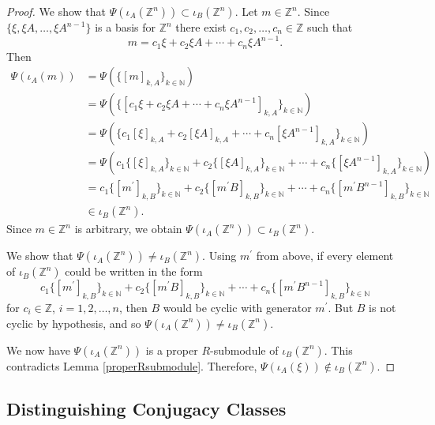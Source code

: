 \documentclass{amsart}
\theoremstyle{plain}
\theoremstyle{definition}
\theoremstyle{remark}
\begin{document}
\begin{proof}
We show that $\Psi(\iota_A({\mathbb Z}^n)) \subset \iota_B({\mathbb Z}^n)$. Let $m\in {\mathbb Z}^n$. Since $\{ \xi, \xi A,\dots, \xi A^{n-1}\}$ is a basis for ${\mathbb Z}^n$ there exist $c_1,c_2,\dots,c_n\in{\mathbb Z}$ such that
\[ m = c_1\xi + c_2 \xi A + \cdots + c_n \xi A^{n-1}.\]
Then
\begin{align*}
\Psi(\iota_A(m)) 
& = \Psi ( \{ [m]_{k,A}\}_{k\in{\mathbb N}}) \\
& = \Psi ( \{ [c_1\xi + c_2\xi A + \cdots + c_n \xi A^{n-1}]_{k,A}\}_{k\in{\mathbb N}}) \\
& = \Psi ( \{ c_1[\xi]_{k,A} + c_2[\xi A]_{k,A} + \cdots + c_n [\xi A^{n-1}]_{k,A}\}_{k\in{\mathbb N}}) \\
& = \Psi ( c_1 \{ [\xi]_{k,A}\}_{k\in{\mathbb N}} + c_2 \{ [\xi A]_{k,A}\}_{k\in{\mathbb N}} + \cdots + c_n \{ [\xi A^{n-1}]_{k,A}\}_{k\in{\mathbb N}} ) \\
& = c_1\{ [m^\prime]_{k,B}\}_{k\in{\mathbb N}} + c_2\{ [m^\prime B]_{k,B}\}_{k\in{\mathbb N}} + \cdots +  c_n\{ [m^\prime B^{n-1}]_{k,B}\}_{k\in{\mathbb N}} \\
& \in \iota_B({\mathbb Z}^n).
\end{align*}
Since $m\in{\mathbb Z}^n$ is arbitrary, we obtain $\Psi(\iota_A({\mathbb Z}^n)) \subset \iota_B({\mathbb Z}^n)$.

We show that $\Psi(\iota_A({\mathbb Z}^n)) \ne \iota_B({\mathbb Z}^n)$.  Using $m^\prime$ from above, if every element of $\iota_B({\mathbb Z}^n)$ could be written in the form
\[ c_1\{ [m^\prime]_{k,B}\}_{k\in{\mathbb N}} + c_2\{ [m^\prime B]_{k,B}\}_{k\in{\mathbb N}} + \cdots +  c_n\{ [m^\prime B^{n-1}]_{k,B}\}_{k\in{\mathbb N}}\]
for $c_i\in {\mathbb Z}$, $i=1,2,\dots,n$, then $B$ would be cyclic with generator $m^\prime$. But $B$ is not cyclic by hypothesis, and so $\Psi(\iota_A({\mathbb Z}^n)) \ne \iota_B({\mathbb Z}^n)$.

We now have $\Psi(\iota_A({\mathbb Z}^n))$ is a proper $R$-submodule of $\iota_B({\mathbb Z}^n)$. This contradicts Lemma \ref{properRsubmodule}. Therefore, $\Psi(\iota_A(\xi))\not\in \iota_B({\mathbb Z}^n)$.
\end{proof}

\subsection{Distinguishing Conjugacy Classes}
\end{document}
